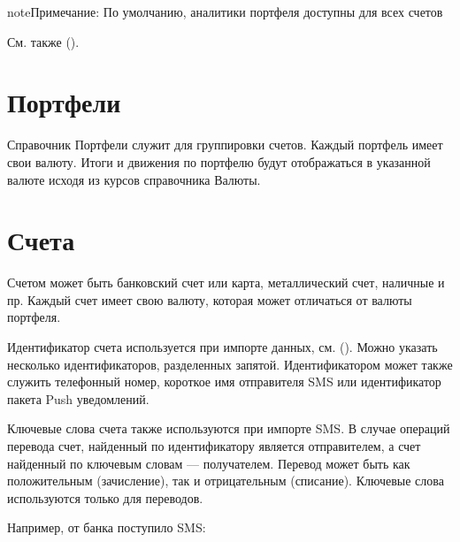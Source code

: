\documentclass[a4paper,10pt,russian]{sphinxmanual}
\begin{document}
\begin{sphinxadmonition}{note}{Примечание:}
\sphinxAtStartPar
По умолчанию, аналитики портфеля  доступны для всех счетов
\end{sphinxadmonition}

\sphinxAtStartPar
См. также {\hyperref[\detokenize{shared-transactions:chapter-shared-transactions}]{}} ().


\section{Портфели}
\label{\detokenize{directories:id3}}
\sphinxAtStartPar
Справочник Портфели служит для группировки счетов. Каждый портфель имеет свои валюту. Итоги и движения по портфелю
будут отображаться в указанной валюте исходя из курсов справочника Валюты.


\section{Счета}
\label{\detokenize{directories:id4}}
\sphinxAtStartPar
Счетом может быть банковский счет или карта, металлический счет,
наличные и пр. Каждый счет имеет свою валюту, которая может отличаться от валюты портфеля.

\sphinxAtStartPar
Идентификатор счета используется при импорте данных, см. {\hyperref[\detokenize{import:chapter-import}]{}} (). Можно указать несколько
идентификаторов, разделенных запятой. Идентификатором может также служить телефонный номер, короткое имя отправителя SMS
или идентификатор пакета Push уведомлений.

\sphinxAtStartPar
Ключевые слова счета также используются при импорте SMS. В случае операций перевода счет, найденный по идентификатору
является отправителем, а счет найденный по ключевым словам — получателем. Перевод может быть как положительным
(зачисление), так и отрицательным (списание). Ключевые слова используются только для переводов.

\sphinxAtStartPar
Например, от банка поступило SMS:

\begin{sphinxVerbatim}[commandchars=\\\{\}]
         
\end{sphinxVerbatim}
\end{document}
